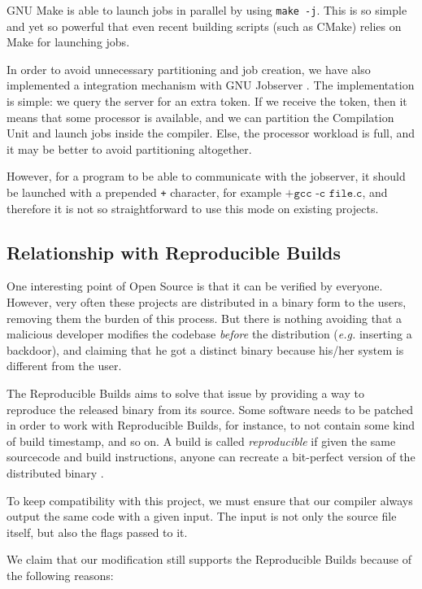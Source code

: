 \documentclass[runningheads]{llncs}
\begin{document}
GNU Make is able to launch jobs in parallel by using \texttt{make -j}. This
is so simple and yet so powerful that even recent building scripts (such as CMake)
relies on Make for launching jobs.

In order to avoid unnecessary partitioning and job creation, we have also
implemented a integration mechanism with GNU Jobserver \cite{posixjobserver}.
The implementation
is simple: we query the server for an extra token. If we receive the token,
then it means that some processor is available, and we can partition the
Compilation Unit and launch jobs inside the compiler. Else, the processor
workload is full, and it may be better to avoid partitioning altogether.

However, for a program to be able to communicate with the jobserver,
it should be launched with a prepended \texttt{+} character,
for example $\texttt{+gcc -c file.c}$, and therefore it is not
so straightforward to use this mode on existing projects.

\subsection{Relationship with Reproducible Builds}\label{sec:repro_builds}

One interesting point of Open Source is that it can be verified by everyone.
However, very often these projects are distributed in a binary form to the
users, removing them the burden of this process. But there is nothing
avoiding that a malicious developer modifies the codebase \textit{before}
the distribution (\textit{e.g.} inserting a backdoor), and claiming that
he got a distinct binary because his/her system is different from the user.

The Reproducible Builds aims to solve that issue by providing a way to
reproduce the released binary from its source. Some software needs to
be patched in order to work with Reproducible Builds, for instance,
to not contain some kind of build timestamp, and so on. A build
is called \textit{reproducible} if given the same sourcecode and build
instructions, anyone can recreate a bit-perfect version of the distributed
binary \cite{reproducible_builds}.

To keep compatibility with this project, we must ensure that our compiler
always output the same code with a given input. The input is not only
the source file itself, but also the flags passed to it.

We claim that our modification still supports the Reproducible Builds because
of the following reasons:
\end{document}
